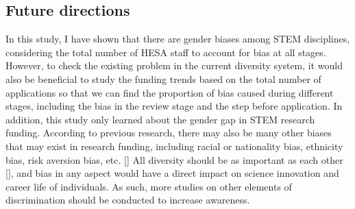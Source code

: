 \subsection{Future directions}

In this study, I have shown that there are gender biases among STEM disciplines, considering the total number of HESA staff to account for bias at all stages. However, to check the existing problem in the current diversity system, it would also be beneficial to study the funding trends based on the total number of applications so that we can find the proportion of bias caused during different stages, including the bias in the review stage and the step before application. In addition, this study only learned about the gender gap in STEM research funding. According to previous research, there may also be many other biases that may exist in research funding, including racial or nationality bias, ethnicity bias, risk aversion bias, etc. [\cite{wojick2015government}] All diversity should be as important as each other [\cite{LSE2018}], and bias in any aspect would have a direct impact on science innovation and career life of individuals. As such, more studies on other elements of discrimination should be conducted to increase awareness. 
